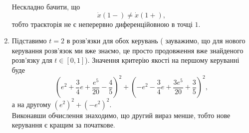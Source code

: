 \begin{solution}
\begin{enumerate}
		Нескладно бачити, що 
		\[ \dot x (1-) \ne \dot x (1+), \]
		тобто траєкторія не є неперервно диференційовною в точці $1$.
		
		\item 
		Підставимо $t=2$ в розв'язки для обох керувань (%
		зауважимо, що для нового керування розв'язок ми вже знаємо, це просто продовження вже знайденого розв'язку для $t \in [0, 1]$). Значення критерію якості на першому керуванні буде
		\[ \left(e^2 + \dfrac34e + \dfrac{e^5}{20} - \dfrac45\right)^2 + \left(-e^2 - \dfrac34e + \dfrac{3e^5}{20} + \dfrac35\right)^2, \]
		а на другому $(e^2)^2 + (-e^2)^2$. \\

	    Виконавши обчислення знаходимо, що другий вираз менше, тобто нове керування є кращим за початкове.
	\end{enumerate}
\end{solution}
